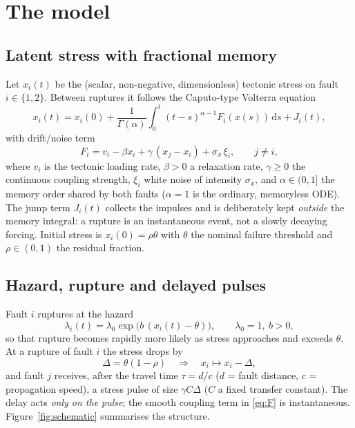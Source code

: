 \documentclass[11pt,a4paper]{article}
\newcommand{\dd}{\,\mathrm{d}}
\begin{document}
\section{The model}
\subsection{Latent stress with fractional memory}
Let $x_i(t)$ be the (scalar, non-negative, dimensionless) tectonic stress on fault $i\in\{1,2\}$. Between ruptures it follows the Caputo-type Volterra equation
\begin{equation}\label{eq:volterra}
x_i(t)=x_i(0)+\frac{1}{\Gamma(\alpha)}\int_0^t (t-s)^{\alpha-1}F_i(x(s))\dd s+J_i(t),
\end{equation}
with drift/noise term
\begin{equation}\label{eq:F}
F_i = v_i-\beta x_i+\gamma\,(x_j-x_i)+\sigma_x\,\xi_i ,\qquad j\neq i,
\end{equation}
where $v_i$ is the tectonic loading rate, $\beta>0$ a relaxation rate, $\gamma\ge0$ the continuous coupling strength, $\xi_i$ white noise of intensity $\sigma_x$, and $\alpha\in(0,1]$ the memory order shared by both faults ($\alpha=1$ is the ordinary, memoryless ODE). The jump term $J_i(t)$ collects the impulses and is deliberately kept \emph{outside} the memory integral: a rupture is an instantaneous event, not a slowly decaying forcing. Initial stress is $x_i(0)=\rho\theta$ with $\theta$ the nominal failure threshold and $\rho\in(0,1)$ the residual fraction.

\subsection{Hazard, rupture and delayed pulses}
Fault $i$ ruptures at the hazard
\begin{equation}\label{eq:hazard}
\lambda_i(t)=\lambda_0\exp\!\big(b\,(x_i(t)-\theta)\big),\qquad \lambda_0=1,\ b>0,
\end{equation}
so that rupture becomes rapidly more likely as stress approaches and exceeds $\theta$. At a rupture of fault $i$ the stress drops by
\begin{equation}\label{eq:drop}
\Delta=\theta(1-\rho)\quad\Rightarrow\quad x_i\mapsto x_i-\Delta,
\end{equation}
and fault $j$ receives, after the travel time $\tau=d/c$ ($d$ = fault distance, $c$ = propagation speed), a stress pulse of size $\gamma C\Delta$ ($C$ a fixed transfer constant). The delay acts \emph{only on the pulse}; the smooth coupling term in \eqref{eq:F} is instantaneous. Figure~\ref{fig:schematic} summarises the structure.
\end{document}
